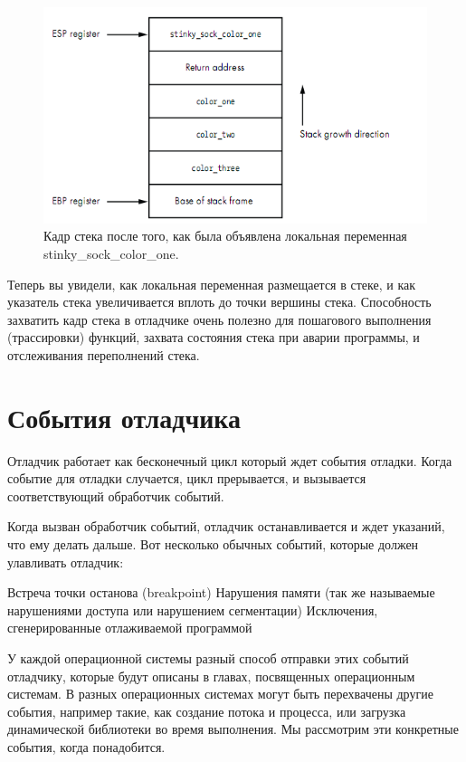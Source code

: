 \documentclass[12pt]{book}
\begin{document}
\begin{figure}
  \center
  \includegraphics{./pic/chap2/2.PNG}
  \caption{Кадр стека после того, как была объявлена локальная переменная stinky\_sock\_color\_one.}
\end{figure}

Теперь вы увидели, как локальная переменная размещается в стеке, и как указатель стека увеличивается вплоть до точки вершины стека. Способность захватить кадр стека в отладчике очень полезно для пошагового выполнения (трассировки) функций, захвата состояния стека при аварии программы, и отслеживания переполнений стека.

\section{События отладчика}

Отладчик работает как бесконечный цикл который ждет события отладки. Когда событие для отладки случается, цикл прерывается, и вызывается соответствующий обработчик событий.

Когда вызван обработчик событий, отладчик останавливается и ждет указаний, что ему делать дальше. Вот несколько обычных событий, которые должен улавливать отладчик:

    Встреча точки останова (breakpoint)
    Нарушения памяти (так же называемые нарушениями доступа или нарушением сегментации)
    Исключения, сгенерированные отлаживаемой программой


У каждой операционной системы разный способ отправки этих событий отладчику, которые будут описаны в главах, посвященных операционным системам. В разных операционных системах могут быть перехвачены другие события, например такие, как создание потока и процесса, или загрузка динамической библиотеки во время выполнения. Мы рассмотрим эти конкретные события, когда понадобится.
\end{document}
